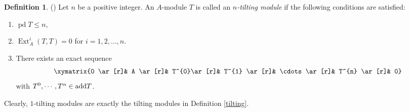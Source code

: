 \documentclass[reqno,12pt]{amsart}
\numberwithin{equation}{section}
\theoremstyle{plain}
\theoremstyle{definition}
\newtheorem{definition}[theorem]{\bf Definition}
\begin{document}
\begin{definition}\label{ntilting}(\cite{MIY})
Let $n$ be a positive integer. An \( A \)-module \( T \) is called an {\em $n$-tilting module} if the following conditions are satisfied:
\begin{enumerate}
\item[(T1)] \( \operatorname{pd} T \leq n \),
\item[(T2)] \( \operatorname{Ext}_A^i(T, T) = 0 \) for $i=1 , 2 ,\dots , n$.
\item[(T3)] There exists an exact sequence
$$\xymatrix{0 \ar[r]& A \ar[r]& T^{0}\ar[r]& T^{1} \ar[r]& \cdots \ar[r]& T^{n} \ar[r]& 0}$$
with $T^{0} , \cdots , T^{n}  \in {\rm add} T $.
\end{enumerate}
\end{definition}
Clearly, $1$-tilting modules are exactly the tilting modules in Definition \ref{tilting}.
\end{document}
